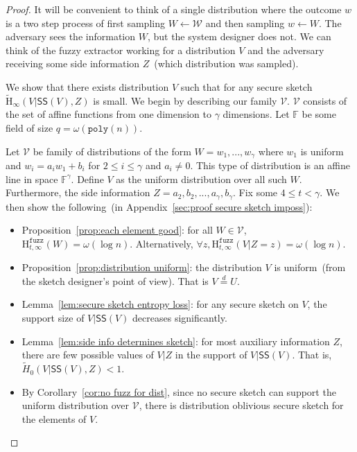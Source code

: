 \documentclass[11pt]{article}
\newcommand{\apref}[1]{\mbox{Appendix~\ref{#1}}}
\newcommand{\corref}[1]{\mbox{Corollary~\ref{#1}}}
\newcommand{\lemref}[1]{\mbox{Lemma~\ref{#1}}}
\newcommand{\propref}[1]{\mbox{Proposition~\ref{#1}}}
\newcommand{\class}[1]{{\ensuremath{\mathsf{#1}}}}
\newcommand{\sketch}{\ensuremath{\class{SS}}\xspace}
\newcommand{\poly}{\ensuremath{\mathtt{poly}}\xspace}
\newcommand{\Hav}{\tilde{\mathrm{H}}_\infty}
\newcommand{\Hfuzz}{\mathrm{H}^{\mathtt{fuzz}}_{t,\infty}}
\begin{document}
\begin{proof}
It will be convenient to think of a single distribution where the outcome $w$ is a two step process of first sampling $W\leftarrow \mathcal{W}$ and then sampling $w\leftarrow W$.  The adversary sees the information $W$, but the system designer does not.  We can think of the fuzzy extractor working for a distribution $V$ and the adversary receiving some side information $Z$~(which distribution was sampled).  

We show that there exists distribution $V$ such that for any secure sketch $\Hav(V | \sketch(V), Z)$ is small.  We begin by describing our family $\mathcal{V}$.  $\mathcal{V}$ consists of the set of affine functions from one dimension to $\gamma$ dimensions.  %
Let $\mathbb{F}$ be some field of size $q =\omega(\poly(n))$.  

Let $\mathcal{V}$ be family of distributions of the form $W = w_1,..., w_\gamma$ where $w_1$ is uniform and $w_i = a_i w_1 + b_i$ for $2\le i \le \gamma$ and $a_i\neq 0$.  This type of distribution is an affine line in space $\mathbb{F}^\gamma$.  Define $V$ as the uniform distribution over all such $W$.  Furthermore, the side information $Z = a_2, b_2, ..., a_\gamma, b_\gamma$. Fix some $4\le t < \gamma$.
We then show the following~(in \apref{sec:proof secure sketch imposs}):

\begin{itemize}
\item \propref{prop:each element good}: for all $W\in \mathcal{V}$, $\Hfuzz(W) = \omega (\log n)$. Alternatively, $\forall z, \Hfuzz(V | Z=z) = \omega(\log n)$.
\item \propref{prop:distribution uniform}: the distribution $V$ is uniform~(from the sketch designer's point of view).  That is $V\overset{d}=U$.
\item \lemref{lem:secure sketch entropy loss}: for any secure sketch on $V$, the support size of $V | \sketch(V)$ decreases significantly.
\item \lemref{lem:side info determines sketch}:  for most auxiliary information $Z$, there are few possible values of $V|Z$ in the support of $V | \sketch(V)$.  That is, $\tilde{H}_0(V | \sketch(V), Z) < 1$.
\item By \corref{cor:no fuzz for dist}, since no secure sketch can support the uniform distribution over $\mathcal{V}$, there is distribution oblivious secure sketch for the elements of $V$.
\end{itemize}
\end{proof}
\end{document}
